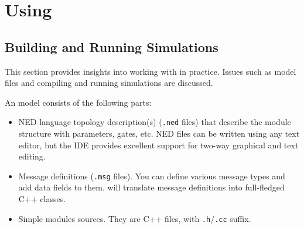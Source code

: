 %
%
%
%
%
%


\section{Using {\opp}}


\subsection{Building and Running Simulations}

This section provides insights into working with {\opp} in practice.
Issues such as model files and compiling and running simulations are
discussed.

An {\opp} model consists of the following parts:
\begin{itemize}
  \item{NED language topology description(s) (\texttt{.ned} files)
    that describe the module structure with parameters, gates, etc.
    NED files can be written using any text editor, but the {\opp} IDE
    provides excellent support for two-way graphical and text editing.}
  \item{Message definitions (\texttt{.msg} files). You can define various message
    types and add data fields to them. {\opp} will translate message definitions
    into full-fledged C++ classes.}
  \item{Simple modules sources. They are C++ files, with \texttt{.h}/\texttt{.cc} suffix.}
\end{itemize}


